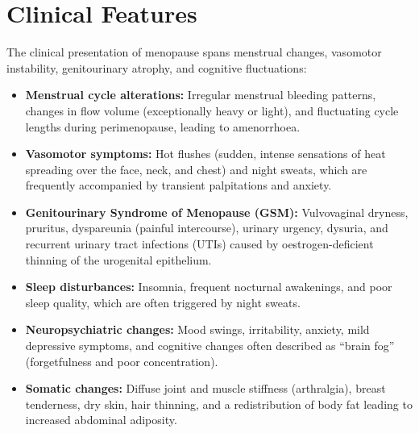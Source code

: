 \section*{Clinical Features}
The clinical presentation of menopause spans menstrual changes, vasomotor instability, genitourinary atrophy, and cognitive fluctuations:
\begin{itemize}
    \item \textbf{Menstrual cycle alterations:} Irregular menstrual bleeding patterns, changes in flow volume (exceptionally heavy or light), and fluctuating cycle lengths during perimenopause, leading to amenorrhoea.
    \item \textbf{Vasomotor symptoms:} Hot flushes (sudden, intense sensations of heat spreading over the face, neck, and chest) and night sweats, which are frequently accompanied by transient palpitations and anxiety.
    \item \textbf{Genitourinary Syndrome of Menopause (GSM):} Vulvovaginal dryness, pruritus, dyspareunia (painful intercourse), urinary urgency, dysuria, and recurrent urinary tract infections (UTIs) caused by oestrogen-deficient thinning of the urogenital epithelium.
    \item \textbf{Sleep disturbances:} Insomnia, frequent nocturnal awakenings, and poor sleep quality, which are often triggered by night sweats.
    \item \textbf{Neuropsychiatric changes:} Mood swings, irritability, anxiety, mild depressive symptoms, and cognitive changes often described as ``brain fog'' (forgetfulness and poor concentration).
    \item \textbf{Somatic changes:} Diffuse joint and muscle stiffness (arthralgia), breast tenderness, dry skin, hair thinning, and a redistribution of body fat leading to increased abdominal adiposity.
\end{itemize}

